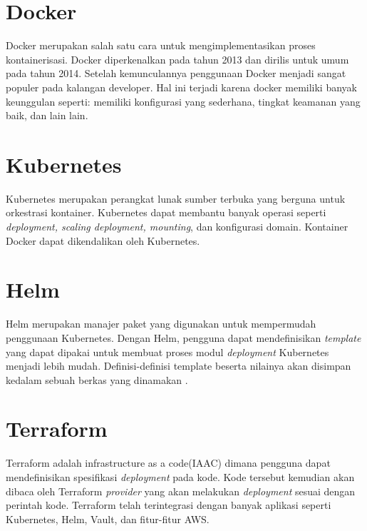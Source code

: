 \section{Docker}
\label{sec:dockerDef}
Docker merupakan salah satu cara untuk mengimplementasikan proses kontainerisasi. Docker diperkenalkan pada tahun 2013 dan dirilis untuk umum pada tahun 2014. Setelah kemunculannya penggunaan Docker menjadi sangat populer pada kalangan developer. Hal ini terjadi karena docker memiliki banyak keunggulan seperti: memiliki konfigurasi yang sederhana, tingkat keamanan yang baik, dan lain lain\citep{setiawan_2021}.
\section{Kubernetes}
\label{sec:kubernetes}
Kubernetes merupakan perangkat lunak sumber terbuka yang berguna untuk orkestrasi kontainer\citep{kubernetes}. Kubernetes dapat membantu banyak operasi seperti \textit{deployment, scaling deployment, mounting}, dan konfigurasi domain. Kontainer Docker dapat dikendalikan oleh Kubernetes.
\section{Helm}
\label{sec:helmDef}
Helm merupakan manajer paket yang digunakan untuk mempermudah penggunaan Kubernetes\citep{merron_idowu_2020}. Dengan Helm, pengguna dapat mendefinisikan \textit{template} yang dapat dipakai untuk membuat proses modul \textit{deployment} Kubernetes menjadi lebih mudah. Definisi-definisi template beserta nilainya akan disimpan kedalam sebuah berkas yang dinamakan .
\section{Terraform}
\label{sec:terraformDef}
Terraform adalah infrastructure as a code(IAAC) dimana pengguna dapat mendefinisikan spesifikasi \textit{deployment} pada kode\citep{terraform}. Kode tersebut kemudian akan dibaca oleh Terraform \textit{provider} yang akan melakukan \textit{deployment} sesuai dengan perintah kode. Terraform telah terintegrasi dengan banyak aplikasi seperti Kubernetes, Helm, Vault, dan fitur-fitur AWS.

